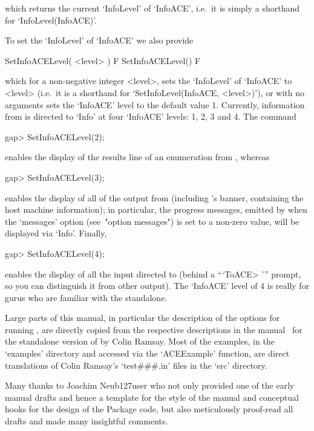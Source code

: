 which returns the current `InfoLevel' of `InfoACE', i.e.~it is  simply
a shorthand for `InfoLevel(InfoACE)'.

To set the `InfoLevel' of `InfoACE' we also provide

\>SetInfoACELevel( <level> ) F
\>SetInfoACELevel() F

which for a non-negative integer  <level>,  sets  the  `InfoLevel'  of
`InfoACE'    to    <level>    (i.e.~it    is    a    shorthand     for
`SetInfoLevel(InfoACE, <level>)'),  or  with  no  arguments  sets  the
`InfoACE' level to the default value 1.  Currently,  information  from
{\ACE} is directed to `Info' at four `InfoACE' levels: 1, 2, 3 and  4.
The command

\beginexample
gap> SetInfoACELevel(2);
\endexample

enables the display of the results line of an enumeration from {\ACE},
whereas

\beginexample
gap> SetInfoACELevel(3);
\endexample

enables the display of  all  of  the  output  from  {\ACE}  (including
{\ACE}'s  banner,  containing  the  host  machine   information);   in
particular,  the  progress  messages,  emitted  by  {\ACE}  when   the
`messages' option (see~"option messages") is set to a non-zero  value,
will be displayed via `Info'. Finally,

\beginexample
gap> SetInfoACELevel(4);
\endexample

enables the display of all the input  directed  to  {\ACE}  (behind  a
```ToACE> ''' prompt, so you can distinguish it  from  other  output).
The `InfoACE' level of 4 is really for gurus who are familiar with the
{\ACE} standalone.


Large parts of this manual,  in  particular  the  description  of  the
options for running {\ACE}, are directly copied  from  the  respective
descriptions in the manual~\cite{Ram99} for the standalone version  of
{\ACE} by Colin Ramsay.  Most  of  the  examples,  in  the  `examples'
directory and accessed  via  the  `ACEExample'  function,  are  direct
translations of Colin Ramsay's  `test\#\#\#.in'  files  in  the  `src'
directory.

Many thanks to Joachim Neub{\accent127u}ser who not only provided  one
of the early manual drafts and hence a template for the style  of  the
manual and conceptual hooks for the design of the  Package  code,  but
also meticulously proof-read  all  drafts  and  made  many  insightful
comments.

